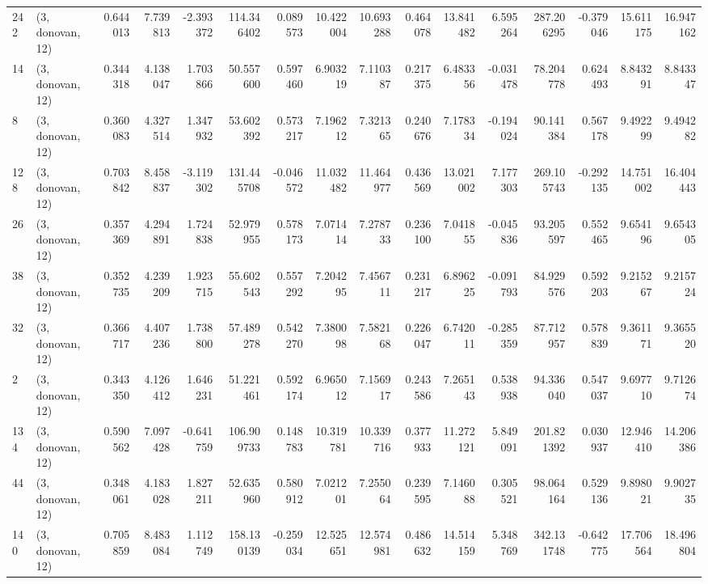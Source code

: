 \begin{tabular}{llrrrrrrrrrrrrrr}
242 &  (3, donovan, 12) &   0.644013 &   7.739813 &  -2.393372 &   114.346402 &   0.089573 &  10.422004 &  10.693288 &  0.464078 &  13.841482 &   6.595264 &   287.206295 &  -0.379046 &  15.611175 &  16.947162 \\
14  &  (3, donovan, 12) &   0.344318 &   4.138047 &   1.703866 &    50.557600 &   0.597460 &   6.903219 &   7.110387 &  0.217375 &   6.483356 &  -0.031478 &    78.204778 &   0.624493 &   8.843291 &   8.843347 \\
8   &  (3, donovan, 12) &   0.360083 &   4.327514 &   1.347932 &    53.602392 &   0.573217 &   7.196212 &   7.321365 &  0.240676 &   7.178334 &  -0.194024 &    90.141384 &   0.567178 &   9.492299 &   9.494282 \\
128 &  (3, donovan, 12) &   0.703842 &   8.458837 &  -3.119302 &   131.445708 &  -0.046572 &  11.032482 &  11.464977 &  0.436569 &  13.021002 &   7.177303 &   269.105743 &  -0.292135 &  14.751002 &  16.404443 \\
26  &  (3, donovan, 12) &   0.357369 &   4.294891 &   1.724838 &    52.979955 &   0.578173 &   7.071414 &   7.278733 &  0.236100 &   7.041855 &  -0.045836 &    93.205597 &   0.552465 &   9.654196 &   9.654305 \\
38  &  (3, donovan, 12) &   0.352735 &   4.239209 &   1.923715 &    55.602543 &   0.557292 &   7.204295 &   7.456711 &  0.231217 &   6.896225 &  -0.091793 &    84.929576 &   0.592203 &   9.215267 &   9.215724 \\
32  &  (3, donovan, 12) &   0.366717 &   4.407236 &   1.738800 &    57.489278 &   0.542270 &   7.380098 &   7.582168 &  0.226047 &   6.742011 &  -0.285359 &    87.712957 &   0.578839 &   9.361171 &   9.365520 \\
2   &  (3, donovan, 12) &   0.343350 &   4.126412 &   1.646231 &    51.221461 &   0.592174 &   6.965012 &   7.156917 &  0.243586 &   7.265143 &   0.538938 &    94.336040 &   0.547037 &   9.697710 &   9.712674 \\
134 &  (3, donovan, 12) &   0.590562 &   7.097428 &  -0.641759 &   106.909733 &   0.148783 &  10.319781 &  10.339716 &  0.377933 &  11.272121 &   5.849091 &   201.821392 &   0.030937 &  12.946410 &  14.206386 \\
44  &  (3, donovan, 12) &   0.348061 &   4.183028 &   1.827211 &    52.635960 &   0.580912 &   7.021201 &   7.255064 &  0.239595 &   7.146088 &   0.305521 &    98.064164 &   0.529136 &   9.898021 &   9.902735 \\
140 &  (3, donovan, 12) &   0.705859 &   8.483084 &   1.112749 &   158.130139 &  -0.259034 &  12.525651 &  12.574981 &  0.486632 &  14.514159 &   5.348769 &   342.131748 &  -0.642775 &  17.706564 &  18.496804 \\

\end{tabular}
